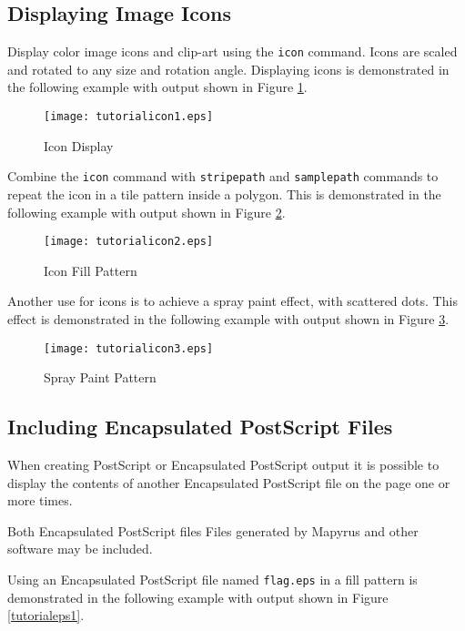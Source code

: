 \subsection{Displaying Image Icons}
\label{icons}

Display color image icons and clip-art using the \texttt{icon} command.
Icons are scaled and rotated to any size and rotation angle.
Displaying icons is demonstrated in the following example
with output shown in Figure \ref{tutorialicon1}.



\begin{figure}[htb]
\texttt{[image: tutorialicon1.eps]}
\caption{Icon Display}
\label{tutorialicon1}
\end{figure}

Combine the \texttt{icon} command with
\texttt{stripepath} and
\texttt{samplepath} commands to
repeat the icon in a tile pattern inside a polygon.
This is demonstrated in the following example
with output shown in Figure \ref{tutorialicon2}.



\begin{figure}[htb]
\texttt{[image: tutorialicon2.eps]}
\caption{Icon Fill Pattern}
\label{tutorialicon2}
\end{figure}

Another use for icons is to achieve a spray paint effect,
with scattered dots.
This effect is demonstrated in the following example
with output shown in Figure \ref{tutorialicon3}.



\begin{figure}[htb]
\texttt{[image: tutorialicon3.eps]}
\caption{Spray Paint Pattern}
\label{tutorialicon3}
\end{figure}

\subsection{Including Encapsulated PostScript Files}

When creating PostScript or Encapsulated PostScript output it 
is possible to display the contents of another Encapsulated PostScript
file on the page one or more times.

Both Encapsulated PostScript files
Files generated by Mapyrus and other software may be included.

Using an Encapsulated PostScript file named \texttt{flag.eps}
in a fill pattern is demonstrated in the following example
with output shown in Figure \ref{tutorialeps1}.

